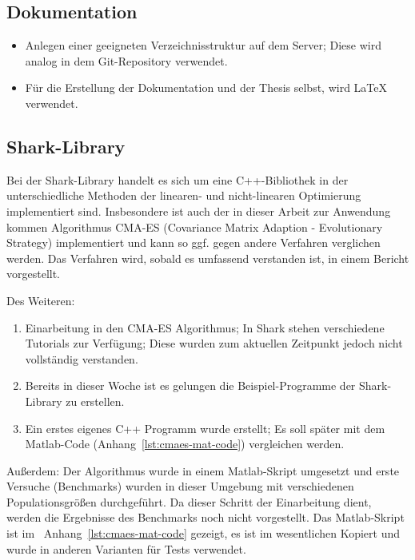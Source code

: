 \documentclass[a4paper,12pt,fleqn]{scrartcl}
\begin{document}
\subsection{Dokumentation}
\begin{itemize}
  \item Anlegen einer geeigneten Verzeichnisstruktur auf dem Server; Diese wird analog in dem Git-Repository verwendet.
  \item Für die Erstellung der Dokumentation und der Thesis selbst, wird
      \LaTeX{} verwendet.

\end{itemize}

\subsection{Shark-Library}
\label{sec:shark}
Bei der Shark-Library \cite{Shark:1} handelt es sich um eine C++-Bibliothek in der unterschiedliche Methoden der linearen- und nicht-linearen Optimierung implementiert sind.
Insbesondere ist auch der in dieser Arbeit zur Anwendung kommen Algorithmus CMA-ES (Covariance Matrix Adaption - Evolutionary Strategy) implementiert und kann so ggf. gegen andere Verfahren verglichen werden.
Das Verfahren wird, sobald es umfassend verstanden ist, in einem Bericht vorgestellt.

Des Weiteren:
\begin{enumerate}
  \item Einarbeitung in den CMA-ES Algorithmus; In Shark stehen verschiedene Tutorials zur Verfügung; Diese wurden zum aktuellen Zeitpunkt jedoch nicht vollständig verstanden.
  \item Bereits in dieser Woche ist es gelungen die Beispiel-Programme der Shark-Library zu erstellen.
  \item Ein erstes eigenes C++ Programm wurde erstellt; Es soll später mit dem Matlab-Code (Anhang~\ref{lst:cmaes-mat-code}) vergleichen werden.

\end{enumerate}

Außerdem:
Der Algorithmus wurde in einem Matlab-Skript umgesetzt und erste Versuche (Benchmarks) wurden in dieser Umgebung mit verschiedenen Populationsgrößen durchgeführt.
Da dieser Schritt der Einarbeitung dient, werden die Ergebnisse des Benchmarks noch nicht vorgestellt.
Das Matlab-Skript ist im \ Anhang~\ref{lst:cmaes-mat-code} gezeigt, es ist im wesentlichen Kopiert und wurde in anderen Varianten für Tests verwendet.
\end{document}
